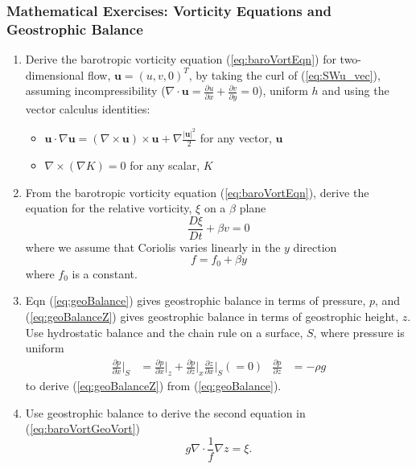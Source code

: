 \subsubsection{Mathematical Exercises: Vorticity Equations and Geostrophic Balance}
\begin{enumerate}
\item Derive the barotropic vorticity equation (\ref{eq:baroVortEqn}) for
two-dimensional flow, $\mathbf{u}=\left(u,v,0\right)^{T}$, by taking
the curl of (\ref{eq:SWu_vec}), assuming incompressibility ($\nabla\cdot\mathbf{u}=\frac{\partial u}{\partial x}+\frac{\partial v}{\partial y}=0$),
uniform $h$ and using the vector calculus identities:
\begin{itemize}
\item $\mathbf{u}\cdot\nabla\mathbf{u}=\left(\nabla\times\mathbf{u}\right)\times\mathbf{u}+\nabla\frac{|\mathbf{u}|^{2}}{2}$
for any vector, $\mathbf{u}$
\item $\nabla\times\left(\nabla K\right)=0$ for any scalar, $K$
\end{itemize}
\item From the barotropic vorticity equation (\ref{eq:baroVortEqn}), derive
the equation for the relative vorticity, $\xi$ on a $\beta$ plane
\begin{equation}
\frac{D\xi}{Dt}+\beta v=0
\end{equation}
where we assume that Coriolis varies linearly in the $y$ direction
\begin{equation}
f=f_{0}+\beta y
\end{equation}
where $f_{0}$ is a constant.
\item Eqn (\ref{eq:geoBalance}) gives geostrophic balance in terms of pressure,
$p$, and (\ref{eq:geoBalanceZ}) gives geostrophic balance in terms
of geostrophic height, $z$. Use hydrostatic balance and the chain
rule on a surface, $S$, where pressure is uniform
\begin{align*}
\frac{\partial p}{\partial x}\bigg|_{S} & =\frac{\partial p}{\partial x}\bigg|_{z}+\frac{\partial p}{\partial z}\bigg|_{x}\frac{\partial z}{\partial x}\bigg|_{S}\left(=0\right) & \frac{\partial p}{\partial z} & =-\rho g
\end{align*}
 to derive (\ref{eq:geoBalanceZ}) from (\ref{eq:geoBalance}).
\item Use geostrophic balance to derive the second equation in (\ref{eq:baroVortGeoVort})
\begin{equation}
g\nabla\cdot\frac{1}{f}\nabla z=\xi.
\end{equation}
\end{enumerate}

